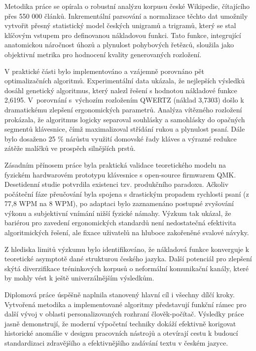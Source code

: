 \documentclass[a4paper, twoside, 12pt, czech]{article}
\begin{document}
Metodika práce se opírala o robustní analýzu korpusu české Wikipedie, čítají\-cího 
přes 550 000 článků. Inkrementální parsování a normalizace těchto dat umož\-nily 
vytvořit přesný statistický model českých unigramů a trigramů, který se stal 
klíčovým vstupem pro definovanou nákladovou funkci. Tato funkce, integrující 
anatomickou náročnost úhozů a plynulost pohybových řetězců, sloužila jako objektivní 
metrika pro hodnocení kvality generovaných rozložení.

V praktické části bylo implementováno a vzájemně porovnáno pět optimalizačních 
algoritmů. Experimentální data ukázala, že nejlepších výsledků dosáhl genetický 
algoritmus, který nalezl řešení s hodnotou nákladové funkce 2,6195. V~porovnání 
s~výchozím rozložením QWERTZ (náklad 3,7303) došlo k dramatickému zlepšení 
ergonomických parametrů. Analýza vítězného rozložení prokázala, že algoritmus 
logicky separoval souhlásky a samohlásky do opačných segmentů klávesnice, čímž 
maximalizoval střídání rukou a plynulost psaní. Dále bylo dosaženo 25 \% nárůstu 
využití domovské řady kláves a výrazné redukce zátěže malíčků ve prospěch 
silnějších prstů.

Zásadním přínosem práce byla praktická validace teoretického modelu na fyzickém 
hardwarovém prototypu klávesnice s open-source firmwarem QMK. Desetidenní 
studie potvrdila existenci tzv. produkčního paradoxu. Ačkoliv 
počáteční fáze přeučování byla spojena s drastickým propadem rychlosti psaní 
(z 77,8 WPM na 8 WPM), po adaptaci bylo zaznamenáno postupné zvyšování výkonu a 
subjektivní vnímání nižší fyzické námahy. Výzkum tak ukázal, že bariérou pro 
zavedení ergonomických standardů není nedostatečná efektivita algoritmických řešení, 
ale fixace uživatelů na hluboce zakořeněné svalové návyky.

Z hlediska limitů výzkumu bylo identifikováno, že nákladová funkce konverguje k 
teoretické asymptotě dané strukturou českého jazyka. Další potenciál pro zlepšení 
skýtá diverzifikace tréninkových korpusů o neformální komunikační kanály, které 
by mohly vést k ještě univerzálnějším výsledkům.

Diplomová práce úspěšně naplnila stanovený hlavní cíl i všechny dílčí kroky. 
Vytvořená metodika a implementované algoritmy představují funkční rámec pro další 
vývoj v oblasti personalizovaných rozhraní člověk-počítač. Výsledky práce jasně 
demonstrují, že moderní výpočetní techniky dokáží efektivně korigovat historické 
anomálie v designu pracovních nástrojů a otevírají cestu k budoucí standardizaci 
zdravějšího a efektivnějšího zadávání textu v českém jazyce.
\end{document}
